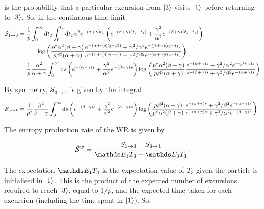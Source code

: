 is the probability that a particular excursion from $\ket{3}$ visits $\ket{1}$ before returning to $\ket{3}$. So, in the continuous time limit 
\begin{align}\label{1to3_EP}
\begin{split}
\mathcal{S}_{1\rightarrow 3} &= \frac{1}{p}\int_0^\infty \mathrm{d} t_2 \int_0^{t_2} \mathrm{d} t_1 \alpha^2 e^{-(\alpha + \gamma)t_1}\left(e^{-(\alpha + \gamma)(t_2-t_1)} + \frac{\gamma^2}{\alpha^2}e^{-(\beta+\gamma)(t_2-t_1)}\right)\\
&\quad \quad \quad \log\left(\frac{p^\ast\alpha^2(\beta + \gamma)}{p\beta^2(\alpha + \gamma)}\frac{e^{-(\alpha + \gamma)(t_2-t1)}+ \gamma^2/\alpha^2e^{-(\beta +\gamma)(t_2-t_1)}}{e^{-(\beta + \gamma)(t_2-t_1)} + \gamma^2/\beta^2 e^{-(\alpha + \gamma)(t_2-t_1)}} \right)\\ 
& = \frac{1}{p}\frac{\alpha^2}{\alpha + \gamma} \int_0^\infty \mathrm{d} s \left(e^{-(\alpha + \gamma)s} + \frac{\gamma^2}{\alpha^2}e^{-(\beta+\gamma)s}\right)\log\left(\frac{p^\ast\alpha^2(\beta + \gamma)}{p\beta^2(\alpha + \gamma)}\frac{e^{-(\alpha + \gamma)s}+ \gamma^2/\alpha^2e^{-(\beta +\gamma)s}}{e^{-(\beta + \gamma)s} + \gamma^2/\beta^2 e^{-(\alpha + \gamma)s}} \right)
\end{split}
\end{align}

By symmetry, $\mathcal{S}_{3\rightarrow 1}$ is given by the integral

\begin{align}\label{3to1_EP}
\small
\begin{split}
\mathcal{S}_{3\rightarrow 1} = \frac{1}{p^\ast}\frac{\beta^2}{\beta + \gamma} \int_0^\infty \mathrm{d} s \left(e^{-(\beta + \gamma)s} + \frac{\gamma^2}{\beta^2}e^{-(\alpha+\gamma)s}\right)\log\left(\frac{p\beta^2(\alpha + \gamma)}{p^\ast\alpha^2(\beta + \gamma)}\frac{e^{-(\beta + \gamma)s}+ \gamma^2/\beta^2e^{-(\alpha +\gamma)s}}{e^{-(\alpha + \gamma)s} + \gamma^2/\alpha^2 e^{-(\beta + \gamma)s}} \right).
\end{split}
\end{align}

The entropy production rate of the WR is given by

\begin{align}
    \entpp^w = \frac{S_{1\rightarrow 3} + S_{3 \rightarrow 1}}{\bE_1T_3 + \bE_3T_1}.
\end{align}

The expectation $\bE_1T_3$ is the expectation value of $T_3$ given the particle is initialised in $\ket{1}$. This is the product of the expected number of excursions required to reach $\ket{3}$, equal to $1/p$, and the expected time taken for each excursion (including the time spent in $\ket{1}$). So,

